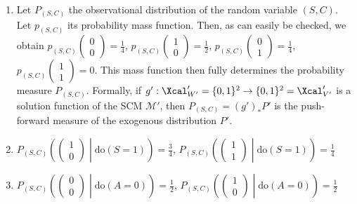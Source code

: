 \begin{enumerate}
\begin{gradedsolution}
\begin{enumerate}
      \begin{equation}
        f' \begin{pmatrix} s \\ c \\ a \\ b \end{pmatrix} = \begin{pmatrix} a \oplus b \\ a \land b \end{pmatrix}.
        \label{eq:probabilistic_case}
      \end{equation}
      \item {} Let $P_{(S,C)}$ the observational distribution of the random variable $(S,C)$. Let $p_{(S,C)}$ its probability mass function.
      Then, as can easily be checked, we obtain $p_{(S,C)}\begin{pmatrix} 0 \\ 0 \end{pmatrix} = \frac{1}{4}$, $p_{(S,C)}\begin{pmatrix} 1 \\ 0 \end{pmatrix} = \frac{1}{2}$, $p_{(S,C)}\begin{pmatrix} 0 \\ 1 \end{pmatrix} = \frac{1}{4}$, $p_{(S,C)}\begin{pmatrix} 1 \\ 1 \end{pmatrix} = 0$.
      This mass function then fully determines the probability measure $P_{(S,C)}$.
      Formally, if $g': \Xcal'_{W'} = \{0,1\}^{2} \to \{0,1\}^{2} = \Xcal'_{V'}$ is a solution function of the SCM $\mathcal{M}'$, then $P_{(S,C)} = (g')_*P'$ is the push-forward measure of the exogenous distribution $P'$.
      \item {} $P_{(S,C)}\left( \begin{pmatrix} 1 \\ 0 \end{pmatrix} \middle| \text{do}(S=1)\right) = \frac{3}{4}$, $P_{(S,C)}\left( \begin{pmatrix} 1 \\ 1 \end{pmatrix} \middle| \text{do}(S=1)\right) = \frac{1}{4}$
      \item {} $P_{(S,C)}\left( \begin{pmatrix} 0 \\ 0 \end{pmatrix} \middle| \text{do}(A=0)\right) = \frac{1}{2}$,   $P_{(S,C)}\left( \begin{pmatrix} 1 \\ 0 \end{pmatrix} \middle| \text{do}(A=0)\right) = \frac{1}{2}$
    \end{enumerate}
  \end{gradedsolution}

\end{enumerate}


